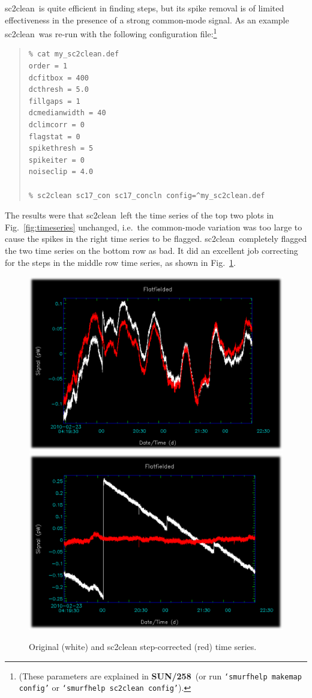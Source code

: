 \documentclass[twoside,11pt]{article}
\newcommand{\xref}[3]{#1}
\renewcommand{\_}{\texttt{\symbol{95}}}
\newenvironment{myquote}{\begin{quote}\begin{small}}{\end{small}\end{quote}}
\newcommand{\task}[1]{\textsf{#1}}
\newcommand{\clean}{\xref{\task{sc2clean}}{sun258}{SC2CLEAN}}
\newcommand{\smurfsun}{\xref{\textbf{SUN/258}}{sun258}{}}
\begin{document}
\clean\ is quite efficient in finding steps, but its spike removal is
of limited effectiveness in the presence of a strong common-mode
signal.  As an example \clean\ was re-run with the following
configuration file:\footnote{(These parameters are explained in
  \smurfsun\ (or run \texttt{`smurfhelp makemap config'} or
  \texttt{`smurfhelp sc2clean config'}).}

\begin{myquote}
\begin{verbatim}
% cat my_sc2clean.def
order = 1
dcfitbox = 400
dcthresh = 5.0
fillgaps = 1
dcmedianwidth = 40
dclimcorr = 0
flagstat = 0
spikethresh = 5
spikeiter = 0
noiseclip = 4.0

% sc2clean sc17_con sc17_concln config=^my_sc2clean.def
\end{verbatim}
\end{myquote}

The results were that \clean\ left the time series of the top two
plots in Fig.~\ref{fig:timeseries} unchanged, i.e.\ the common-mode
variation was too large to cause the spikes in the right time series
to be flagged. \clean\ completely flagged the two time series on the
bottom row as bad. It did an excellent job correcting for the steps in
the middle row time series, as shown in Fig.\ \ref{fig:stepcorrectcf}.

\begin{figure}
\begin{center}
\includegraphics[width=0.45\linewidth]{sc19_sc2clean_13_31}
\hspace{0.03\linewidth}
\includegraphics[width=0.45\linewidth]{sc19_sc2clean_16_33}
\caption{Original (white) and sc2clean step-corrected (red) time series.}
\label{fig:stepcorrectcf}
\end{center}
\end{figure}
\end{document}
